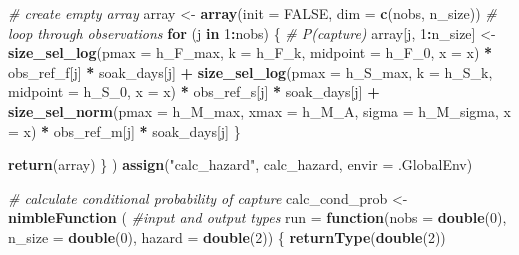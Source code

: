 \documentclass[
]{article}
\newenvironment{Shaded}{\begin{snugshade}}{\end{snugshade}}
\newcommand{\AttributeTok}[1]{\textcolor[rgb]{0.13,0.29,0.53}{#1}}
\newcommand{\CommentTok}[1]{\textcolor[rgb]{0.56,0.35,0.01}{\textit{#1}}}
\newcommand{\ConstantTok}[1]{\textcolor[rgb]{0.56,0.35,0.01}{#1}}
\newcommand{\ControlFlowTok}[1]{\textcolor[rgb]{0.13,0.29,0.53}{\textbf{#1}}}
\newcommand{\DecValTok}[1]{\textcolor[rgb]{0.00,0.00,0.81}{#1}}
\newcommand{\FunctionTok}[1]{\textcolor[rgb]{0.13,0.29,0.53}{\textbf{#1}}}
\newcommand{\NormalTok}[1]{#1}
\newcommand{\OtherTok}[1]{\textcolor[rgb]{0.56,0.35,0.01}{#1}}
\newcommand{\SpecialCharTok}[1]{\textcolor[rgb]{0.81,0.36,0.00}{\textbf{#1}}}
\newcommand{\StringTok}[1]{\textcolor[rgb]{0.31,0.60,0.02}{#1}}
\begin{document}
\begin{Shaded}
\begin{Highlighting}[]
      \CommentTok{\# create empty array}
\NormalTok{      array }\OtherTok{\textless{}{-}} \FunctionTok{array}\NormalTok{(}\AttributeTok{init =} \ConstantTok{FALSE}\NormalTok{, }\AttributeTok{dim =} \FunctionTok{c}\NormalTok{(nobs, n\_size))}
      \CommentTok{\# loop through observations}
      \ControlFlowTok{for}\NormalTok{ (j }\ControlFlowTok{in} \DecValTok{1}\SpecialCharTok{:}\NormalTok{nobs) \{}
        \CommentTok{\# P(capture)}
\NormalTok{        array[j, }\DecValTok{1}\SpecialCharTok{:}\NormalTok{n\_size] }\OtherTok{\textless{}{-}} \FunctionTok{size\_sel\_log}\NormalTok{(}\AttributeTok{pmax =}\NormalTok{ h\_F\_max, }\AttributeTok{k =}\NormalTok{ h\_F\_k,}
                                           \AttributeTok{midpoint =}\NormalTok{ h\_F\_0, }\AttributeTok{x =}\NormalTok{ x) }\SpecialCharTok{*}
\NormalTok{          obs\_ref\_f[j] }\SpecialCharTok{*}\NormalTok{ soak\_days[j] }\SpecialCharTok{+}
          \FunctionTok{size\_sel\_log}\NormalTok{(}\AttributeTok{pmax =}\NormalTok{ h\_S\_max, }\AttributeTok{k =}\NormalTok{ h\_S\_k, }\AttributeTok{midpoint =}\NormalTok{ h\_S\_0, }\AttributeTok{x =}\NormalTok{ x) }\SpecialCharTok{*}
\NormalTok{          obs\_ref\_s[j] }\SpecialCharTok{*}\NormalTok{ soak\_days[j] }\SpecialCharTok{+}
          \FunctionTok{size\_sel\_norm}\NormalTok{(}\AttributeTok{pmax =}\NormalTok{ h\_M\_max, }\AttributeTok{xmax =}\NormalTok{ h\_M\_A, }
                        \AttributeTok{sigma =}\NormalTok{ h\_M\_sigma, }\AttributeTok{x =}\NormalTok{ x) }\SpecialCharTok{*}
\NormalTok{          obs\_ref\_m[j] }\SpecialCharTok{*}\NormalTok{ soak\_days[j]}
\NormalTok{      \}}
      
      \FunctionTok{return}\NormalTok{(array)}
\NormalTok{    \}}
\NormalTok{  )}
  \FunctionTok{assign}\NormalTok{(}\StringTok{"calc\_hazard"}\NormalTok{, calc\_hazard, }\AttributeTok{envir =}\NormalTok{ .GlobalEnv)}
  
  \CommentTok{\# calculate conditional probability of capture}
\NormalTok{  calc\_cond\_prob }\OtherTok{\textless{}{-}} \FunctionTok{nimbleFunction}\NormalTok{ (}
    \CommentTok{\#input and output types}
    \AttributeTok{run =} \ControlFlowTok{function}\NormalTok{(}\AttributeTok{nobs =} \FunctionTok{double}\NormalTok{(}\DecValTok{0}\NormalTok{), }\AttributeTok{n\_size =} \FunctionTok{double}\NormalTok{(}\DecValTok{0}\NormalTok{), }\AttributeTok{hazard =} \FunctionTok{double}\NormalTok{(}\DecValTok{2}\NormalTok{))}
\NormalTok{    \{}
      \FunctionTok{returnType}\NormalTok{(}\FunctionTok{double}\NormalTok{(}\DecValTok{2}\NormalTok{))}
      

\end{Highlighting}
\end{Shaded}
\end{document}
